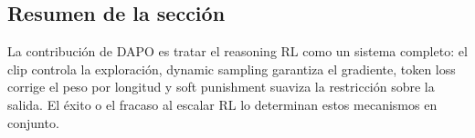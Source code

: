 \subsection{Resumen de la sección}

La contribución de DAPO es tratar el reasoning RL como un sistema completo: el clip controla la exploración, dynamic sampling garantiza el gradiente, token loss corrige el peso por longitud y soft punishment suaviza la restricción sobre la salida. El éxito o el fracaso al escalar RL lo determinan estos mecanismos en conjunto.

